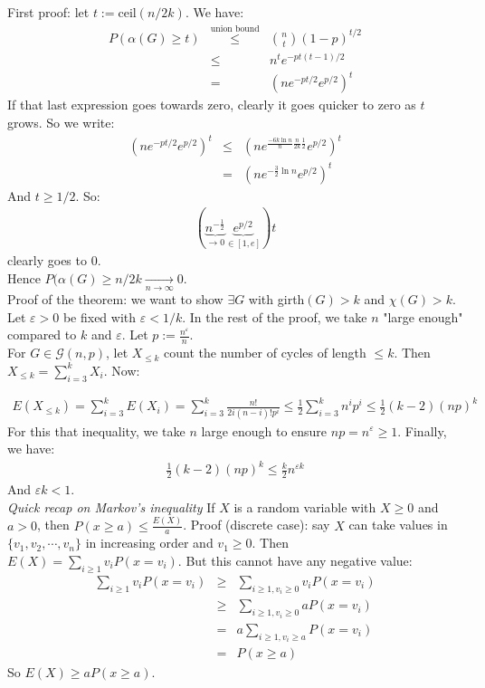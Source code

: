 \documentclass[11pt]{book}
\begin{document}
First proof: let $t := \text{ceil}(n/2k)$. We have:
\begin{eqnarray}
	P(\alpha(G) \geq t) &\overset{\text{union bound}}\leq& {{n}\choose{t}} (1 - p)^{t/2} \\
	&\leq& n^t e^{-pt(t-1)/2} \\
	&=& (ne^{-pt/2}e^{p/2})^t
\end{eqnarray}
If that last expression goes towards zero, clearly it goes quicker to zero as $t$ grows. So we write:
\begin{eqnarray}
	(ne^{-pt/2}e^{p/2})^t &\leq& (ne^{\frac{-6k\ln n}{n} \frac{n}{2k} \frac{1}{2}} e^{p/2})^t \\
	&=& (ne^{-\frac{3}{2} \ln n} e^{p/2})^t
\end{eqnarray}
And $t \geq 1/2$. So:
\begin{eqnarray}
	(\underbrace{n^{-\frac{1}{2}}}_{\rightarrow 0}  \underbrace{e^{p/2}}_{\in [1,e]})t
\end{eqnarray}
clearly goes to 0.\\
Hence $P(\alpha(G) \geq n/2k \underset{n \rightarrow \infty}\rightarrow 0$.\\

Proof of the theorem: we want to show $\exists G$ with girth$(G) > k$ and $\chi(G) > k$. Let $\varepsilon > 0$ be fixed with $\varepsilon < 1/k$. In the rest of the proof, we take $n$ "large enough" compared to $k$ and $\varepsilon$. Let $p := \frac{n^\varepsilon}{n}$.\\

For $G \in \mathcal{G}(n,p)$, let $X_{\leq k}$ count the number of cycles of length $\leq k$. Then $X_{\leq k} = \sum_{i = 3}^k X_i$. Now:

\begin{eqnarray}
	E(X_{\leq k}) = \sum_{i=3}^k E(X_i) = \sum_{i=3}^k \frac{n!}{2i(n-i)! p^i} \leq \frac{1}{2} \sum_{i=3}^k n^i p^i \leq \frac{1}{2} (k-2)(np)^k
\end{eqnarray}
For this that inequality, we take $n$ large enough to ensure $np = n^\varepsilon \geq 1$. Finally, we have:
\begin{eqnarray}
	\frac{1}{2} (k-2)(np)^k \leq \frac{k}{2} n^{\varepsilon k}
\end{eqnarray}
And $\varepsilon k < 1$.\\


\textit{Quick recap on Markov's inequality}
If $X$ is a random variable with $X \geq 0$ and $a > 0$, then $P(x \geq a) \leq \frac{E(X)}{a}$. Proof (discrete case): say $X$ can take values in $\{v_1, v_2, \dotsb, v_n\}$ in increasing order and $v_1 \geq 0$. Then $E(X) = \sum_{i \geq 1} v_i P(x = v_i)$. But this cannot have any negative value: 
\begin{eqnarray}
	\sum_{i \geq 1} v_i P(x = v_i) &\geq& \sum_{i \geq 1, v_i \geq 0} v_i P(x = v_i) \\
	&\geq&\sum_{i \geq 1, v_i \geq 0}  aP(x = v_i) \\
	&=& a \sum_{i \geq 1, v_i \geq a} P(x = v_i)\\
	&=& P(x \geq a) 
\end{eqnarray} 	
So $E(X) \geq a P(x \geq a)$.
		
\end{document}
